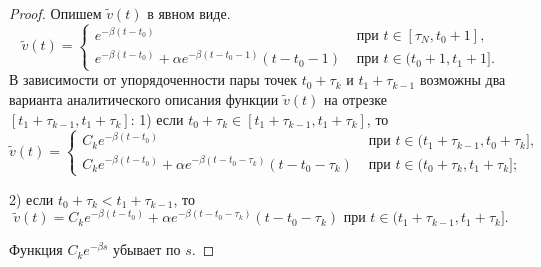 \begin{proof}
	Опишем $\tilde{v}(t)$ в явном виде.
	\[
	\tilde{v}(t) = 
	\begin{cases}
		e^{-\beta(t-t_0)} & \text{ при } t\in[\tau_N,t_0+1],\\
		e^{-\beta(t-t_0)}+\alpha e^{-\beta (t-t_0-1)} (t-t_0-1) & \text{ при } t\in(t_0+1,t_1+1].
	\end{cases}
	\]
	В зависимости от упорядоченности пары точек $t_0+\tau_k$ и $t_1+\tau_{k-1}$ возможны два варианта аналитического описания функции $\tilde{v}(t)$ на отрезке $[t_1+\tau_{k-1},t_1+\tau_k]$:
	1) если $t_0+\tau_k\in[t_1+\tau_{k-1},t_1+\tau_k]$, то
	\begin{equation}
		\label{eq:v_hair1}
		\tilde{v}(t)=
		\begin{cases}
			C_k e^{-\beta(t-t_0)} & \text{ при } t\in(t_1+\tau_{k-1},t_0+\tau_k],\\
			C_k e^{-\beta(t-t_0)} + \alpha e^{-\beta (t-t_0-\tau_k)} (t-t_0-\tau_k) & \text{ при } t\in(t_0+\tau_k,t_1+\tau_k];
		\end{cases}
	\end{equation}
		
	2) если $t_0+\tau_{k} < t_1+\tau_{k-1}$, то
	\begin{equation}
		\label{eq:v_hair2} 
		\tilde{v}(t)= C_k e^{-\beta(t-t_0)}+\alpha e^{-\beta (t-t_0-\tau_k)} (t-t_0-\tau_k) \text{ при } t\in(t_1+\tau_{k-1},t_1+\tau_k].
	\end{equation}
	
	
	Функция $C_ke^{-\beta s}$ убывает по $s$.
	

\end{proof}
